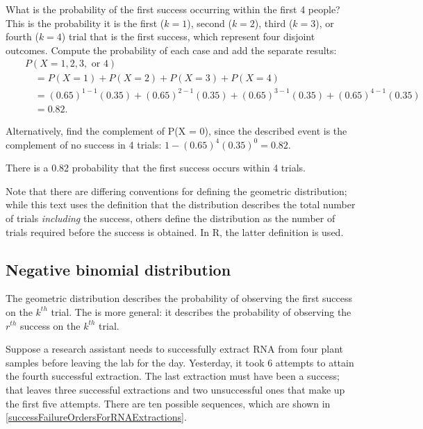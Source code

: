 \begin{examplewrap}
\begin{nexample}{What is the probability of the first success occurring within the first 4 people?}\label{marglimFirstSuccessIn4}%
This is the probability it is the first ($k=1$), second ($k=2$), third ($k=3$), or fourth ($k=4$) trial that is the first success, which represent four disjoint outcomes. Compute the probability of each case and add the separate results:
\begin{eqnarray*}
&&P(X=1, 2, 3,\text{ or }4) \\
	&& \quad = P(X=1)+P(X=2)+P(X=3)+P(X=4) \\
	&& \quad = (0.65)^{1-1}(0.35) + (0.65)^{2-1}(0.35) + (0.65)^{3-1}(0.35) + (0.65)^{4-1}(0.35) \\
	&& \quad = 0.82.
\end{eqnarray*}

Alternatively, find the complement of P(X = 0), since the described event is the complement of no success in 4 trials: $1 - (0.65)^{4}(0.35)^{0} = 0.82$.

There is a 0.82 probability that the first success occurs within 4 trials.
\end{nexample}
\end{examplewrap}

Note that there are differing conventions for defining the geometric distribution; while this text uses the definition that the distribution describes the total number of trials \textit{including} the success, others define the distribution as the number of trials required before the success is obtained. In \textsf{R}, the latter definition is used. 



\textD{\newpage}


\subsection{Negative binomial distribution}
\label{negativeBinomial}


The geometric distribution describes the probability of observing the first success on the $k^{th}$ trial. The  is more general: it describes the probability of observing the $r^{th}$ success on the $k^{th}$ trial.

Suppose a research assistant needs to successfully extract RNA from four plant samples before leaving the lab for the day. Yesterday, it took 6 attempts to attain the fourth successful extraction. The last extraction must have been a success; that leaves three successful extractions and two unsuccessful ones that make up the first five attempts. There are ten possible sequences, which are shown in \ref{successFailureOrdersForRNAExtractions}. 

